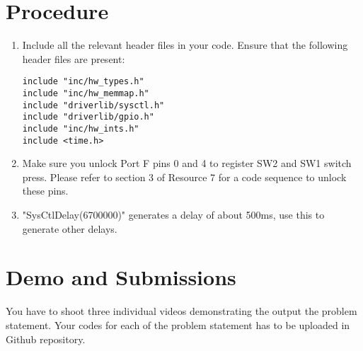\documentclass{article} %
\newcounter{other}
\newcounter{source}
\begin{document}
\section {Procedure}
\begin{enumerate}
\item 
Include all the relevant header files in your code. Ensure that the following header files are present:
\begin{lstlisting}
include "inc/hw_types.h"
include "inc/hw_memmap.h"
include "driverlib/sysctl.h"
include "driverlib/gpio.h"
include "inc/hw_ints.h"
include <time.h>
\end{lstlisting}
\item
Make sure you unlock Port F pins 0 and 4 to register SW2 and SW1 switch press. Please refer to section 3 of Resource 7 for a code sequence to unlock these pins.
\item
"SysCtlDelay(6700000)" generates a delay of about 500ms, use this to generate other delays.
\end{enumerate}
\section {Demo and Submissions}
You have to shoot three individual videos demonstrating the output the problem statement.
Your codes for each of the problem statement has to be uploaded in Github repository.








\end{document}
